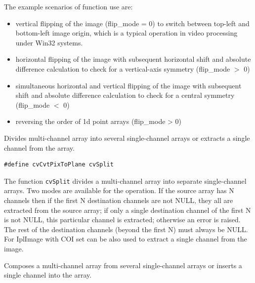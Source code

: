 The example scenarios of function use are:
\begin{itemize}
  \item vertical flipping of the image (flip\_mode = 0) to switch between top-left and bottom-left image origin, which is a typical operation in video processing under Win32 systems.
  \item horizontal flipping of the image with subsequent horizontal shift and absolute difference calculation to check for a vertical-axis symmetry (flip\_mode $>$ 0)
  \item simultaneous horizontal and vertical flipping of the image with subsequent shift and absolute difference calculation to check for a central symmetry (flip\_mode $<$ 0)
  \item reversing the order of 1d point arrays (flip\_mode > 0)
\end{itemize}

\label{Split}

Divides multi-channel array into several single-channel arrays or extracts a single channel from the array.


\begin{lstlisting}
#define cvCvtPixToPlane cvSplit
\end{lstlisting}

\begin{description}
\end{description}

The function \texttt{cvSplit} divides a multi-channel array into separate
single-channel arrays. Two modes are available for the operation. If the
source array has N channels then if the first N destination channels
are not NULL, they all are extracted from the source array;
if only a single destination channel of the first N is not NULL, this
particular channel is extracted; otherwise an error is raised. The rest
of the destination channels (beyond the first N) must always be NULL. For
IplImage  with COI set can be also used to extract a single
channel from the image.


\label{Merge}

Composes a multi-channel array from several single-channel arrays or inserts a single channel into the array.

